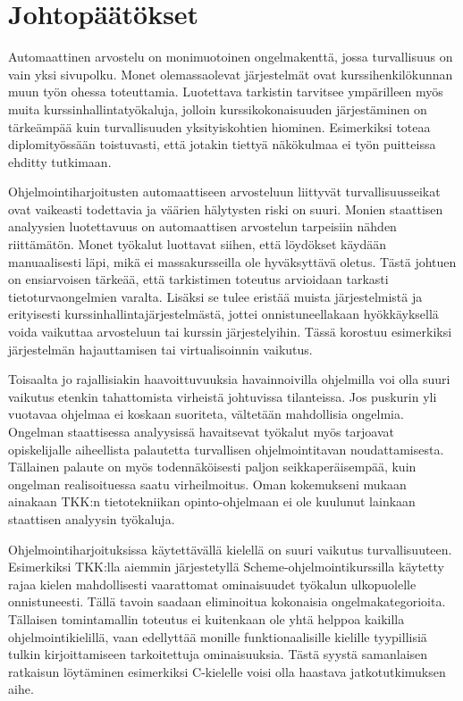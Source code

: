 
\section{Johtopäätökset}
\label{sec:paketointi}

Automaattinen arvostelu on monimuotoinen ongelmakenttä, jossa turvallisuus
on vain yksi sivupolku. Monet olemassaolevat järjestelmät ovat
kurssihenkilökunnan muun työn ohessa toteuttamia. Luotettava tarkistin
tarvitsee ympärilleen myös muita kurssinhallintatyökaluja, jolloin
kurssikokonaisuuden järjestäminen on tärkeämpää kuin turvallisuuden
yksityiskohtien hiominen. Esimerkiksi \citet{Hiisila2005} toteaa
diplomityössään toistuvasti, että jotakin tiettyä
näkökulmaa ei työn puitteissa ehditty tutkimaan.

Ohjelmointiharjoitusten automaattiseen arvosteluun liittyvät turvallisuusseikat
ovat vaikeasti todettavia ja väärien hälytysten riski on suuri. Monien
staattisen analyysien luotettavuus on automaattisen arvostelun tarpeisiin
nähden riittämätön. Monet työkalut luottavat siihen, että löydökset käydään
manuaalisesti läpi, mikä ei massakursseilla ole hyväksyttävä oletus. Tästä
johtuen on ensiarvoisen tärkeää, että tarkistimen toteutus arvioidaan tarkasti
tietoturvaongelmien varalta. Lisäksi se tulee eristää muista järjestelmistä ja
erityisesti kurssinhallintajärjestelmästä, jottei onnistuneellakaan
hyökkäyksellä voida vaikuttaa arvosteluun tai kurssin järjestelyihin. Tässä
korostuu esimerkiksi järjestelmän hajauttamisen tai virtualisoinnin vaikutus.

Toisaalta jo rajallisiakin haavoittuvuuksia havainnoivilla ohjelmilla voi olla
suuri vaikutus etenkin tahattomista virheistä johtuvissa tilanteissa. Jos
puskurin yli vuotavaa ohjelmaa ei koskaan suoriteta, vältetään
mahdollisia ongelmia. Ongelman staattisessa analyysissä havaitsevat työkalut
myös tarjoavat opiskelijalle aiheellista palautetta turvallisen ohjelmointitavan
noudattamisesta. Tällainen palaute on myös todennäköisesti paljon
seikkaperäisempää, kuin ongelman realisoituessa saatu virheilmoitus. Oman
kokemukseni mukaan ainakaan TKK:n tietotekniikan opinto-ohjelmaan ei ole
kuulunut lainkaan staattisen analyysin työkaluja.

Ohjelmointiharjoituksissa käytettävällä kielellä on suuri vaikutus
turvallisuuteen. Esimerkiksi TKK:lla aiemmin järjestetyllä Scheme-ohjelmointikurssilla
käytetty {\scmrobo} rajaa kielen mahdollisesti vaarattomat ominaisuudet
työkalun ulkopuolelle onnistuneesti. Tällä tavoin saadaan eliminoitua
kokonaisia ongelmakategorioita. Tällaisen tomintamallin toteutus ei kuitenkaan
ole yhtä helppoa kaikilla ohjelmointikielillä, vaan edellyttää monille
funktionaalisille kielille tyypillisiä tulkin kirjoittamiseen tarkoitettuja
ominaisuuksia. Tästä syystä samanlaisen ratkaisun löytäminen esimerkiksi
C-kielelle voisi olla haastava jatkotutkimuksen aihe.

